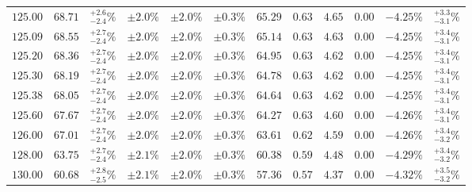 \begin{landscape}
\begin{table}[ht!]
{\begin{tabular}{| cc | c | ccc | ccccc | c |}
$125.00$ & $68.71$ & $^{+2.6}_{-2.4}\%$ & $\pm 2.0\%$ & {\color{black!55}$\pm 2.0\%$} & {\color{black!55}$\pm 0.3\%$} & $65.29$ & $0.63$ & $4.65$ & $0.00$ & $-4.25\%$ & $^{+3.3}_{-3.1}\%$ \\
$125.09$ & $68.55$ & $^{+2.7}_{-2.4}\%$ & $\pm 2.0\%$ & {\color{black!55}$\pm 2.0\%$} & {\color{black!55}$\pm 0.3\%$} & $65.14$ & $0.63$ & $4.63$ & $0.00$ & $-4.25\%$ & $^{+3.4}_{-3.1}\%$ \\
$125.20$ & $68.36$ & $^{+2.7}_{-2.4}\%$ & $\pm 2.0\%$ & {\color{black!55}$\pm 2.0\%$} & {\color{black!55}$\pm 0.3\%$} & $64.95$ & $0.63$ & $4.62$ & $0.00$ & $-4.25\%$ & $^{+3.4}_{-3.1}\%$ \\
$125.30$ & $68.19$ & $^{+2.7}_{-2.4}\%$ & $\pm 2.0\%$ & {\color{black!55}$\pm 2.0\%$} & {\color{black!55}$\pm 0.3\%$} & $64.78$ & $0.63$ & $4.62$ & $0.00$ & $-4.25\%$ & $^{+3.4}_{-3.1}\%$ \\
$125.38$ & $68.05$ & $^{+2.7}_{-2.4}\%$ & $\pm 2.0\%$ & {\color{black!55}$\pm 2.0\%$} & {\color{black!55}$\pm 0.3\%$} & $64.64$ & $0.63$ & $4.62$ & $0.00$ & $-4.25\%$ & $^{+3.4}_{-3.1}\%$ \\
$125.60$ & $67.67$ & $^{+2.7}_{-2.4}\%$ & $\pm 2.0\%$ & {\color{black!55}$\pm 2.0\%$} & {\color{black!55}$\pm 0.3\%$} & $64.27$ & $0.63$ & $4.60$ & $0.00$ & $-4.26\%$ & $^{+3.4}_{-3.1}\%$ \\
$126.00$ & $67.01$ & $^{+2.7}_{-2.4}\%$ & $\pm 2.0\%$ & {\color{black!55}$\pm 2.0\%$} & {\color{black!55}$\pm 0.3\%$} & $63.61$ & $0.62$ & $4.59$ & $0.00$ & $-4.26\%$ & $^{+3.4}_{-3.2}\%$ \\
$128.00$ & $63.75$ & $^{+2.7}_{-2.4}\%$ & $\pm 2.1\%$ & {\color{black!55}$\pm 2.0\%$} & {\color{black!55}$\pm 0.3\%$} & $60.38$ & $0.59$ & $4.48$ & $0.00$ & $-4.29\%$ & $^{+3.4}_{-3.2}\%$ \\
$130.00$ & $60.68$ & $^{+2.8}_{-2.5}\%$ & $\pm 2.1\%$ & {\color{black!55}$\pm 2.0\%$} & {\color{black!55}$\pm 0.3\%$} & $57.36$ & $0.57$ & $4.37$ & $0.00$ & $-4.32\%$ & $^{+3.5}_{-3.2}\%$ \\
\cline{1-12}
\end{tabular}
}
\end{table}


\end{landscape}
